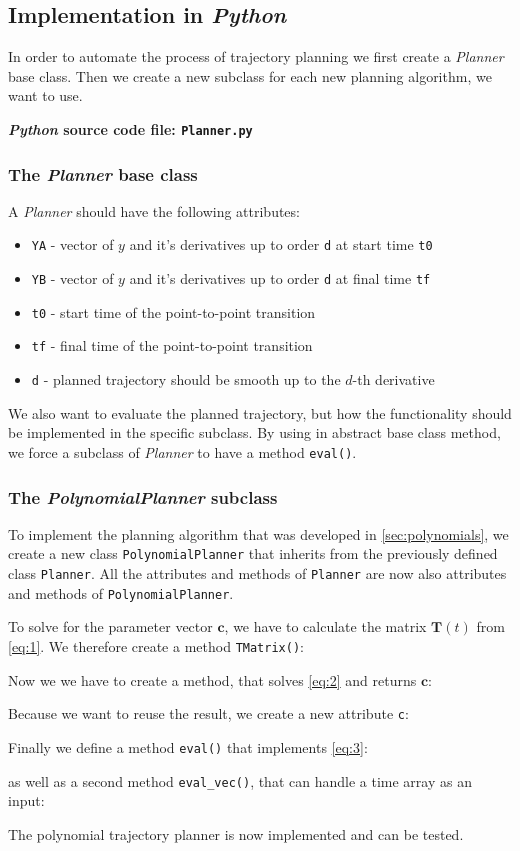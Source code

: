 \documentclass[a4paper,11pt,headings=standardclasses,parskip=half]{scrartcl}
\newcommand{\listcode}[3]{}
\newcommand{\listcodeplanner}[2]{\listcode{#1}{#2}{../sim/Planner.py}}
\newcommand{\py}{\emph{Python}\xspace}
\begin{document}
\subsection{Implementation in \py}
In order to automate the process of trajectory planning we first create a \emph{Planner} base class. Then we create a new subclass for each new planning algorithm, we want to use.

\textbf{\py source code file: \texttt{Planner.py}}
\subsubsection{The \emph{Planner} base class}
A \emph{Planner} should have the following attributes:
\begin{itemize}
	\item[] \texttt{YA} - vector of $y$ and it's derivatives up to order \texttt{d} at start time \texttt{t0}
	\item[] \texttt{YB} - vector of $y$ and it's derivatives up to order \texttt{d} at final time \texttt{tf}
	\item[] \texttt{t0} - start time of the point-to-point transition
	\item[] \texttt{tf} - final time of the point-to-point transition
	\item[] \texttt{d} - planned trajectory should be smooth up to the $d$-th derivative
\end{itemize}
We also want to evaluate the planned trajectory, but how the functionality should be implemented in the specific subclass. By using in abstract base class method, we force a subclass of \emph{Planner} to have a method \texttt{eval()}.
\listcodeplanner{2}{27}
\subsubsection{The \emph{PolynomialPlanner} subclass}
\label{sec:polynomialplanner}
To implement the planning algorithm that was developed in \autoref{sec:polynomials}, we create a new class \texttt{PolynomialPlanner} that inherits from the previously defined class \texttt{Planner}. All the attributes and methods of \texttt{Planner} are now also attributes and methods of \texttt{PolynomialPlanner}.
\listcodeplanner{28}{33}
To solve for the parameter vector $\mathbf{c}$, we have to calculate the matrix $\mathbf{T}(t)$ from \eqref{eq:1}. We therefore create a method \texttt{TMatrix()}:
\listcodeplanner{73}{94}
Now we we have to create a method, that solves \eqref{eq:2} and returns $\mathbf{c}$:
\listcodeplanner{97}{116}
Because we want to reuse the result, we create a new attribute \texttt{c}:
\listcodeplanner{35}{79}
Finally we define a method \texttt{eval()} that implements \eqref{eq:3}:
\listcodeplanner{39}{54}
as well as a second method \texttt{eval\_vec()}, that can handle a time array as an input:
\listcodeplanner{57}{70}
The polynomial trajectory planner is now implemented and can be tested.
\end{document}
